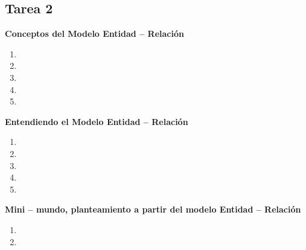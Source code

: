 \documentclass{report}
\begin{document}
	
	
	
	\begin{center}
		\section*{\LARGE{Tarea 2}}
	\end{center}

    \begin{center}
        \LARGE{\textbf{Conceptos del Modelo Entidad – Relación}}\\
    \end{center}
    \normalsize

    \begin{enumerate}[label=\alph*.]
        \item 
        \item 
        \item 
        \item 
        \item 
    \end{enumerate}

    \begin{center}
        \LARGE{\textbf{Entendiendo el Modelo Entidad – Relación}}\\
    \end{center}
    \normalsize

    \begin{enumerate}%
        \item 
        \item 
        \item 
        \item 
        \item 
    \end{enumerate}

    \begin{center}
        \LARGE{\textbf{Mini – mundo, planteamiento a partir del modelo Entidad – Relación}}\\
    \end{center}
    \normalsize

    \begin{enumerate}[label=\alph*.]
        \item 
        \newpage
        \item 
    \end{enumerate}

    \newpage
    
\printbibliography
  
\end{document}
